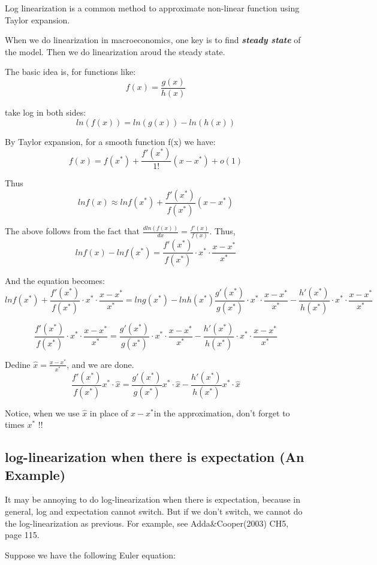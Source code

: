 \documentclass{book}
\theoremstyle{plain}
\theoremstyle{definition}
\begin{document}
Log linearization is a common method to approximate non-linear function using Taylor expansion.

When we do linearization in macroeconomics, one key is to find \emph{\textbf{steady state}} of the model.
Then we do linearization aroud the steady state.

The basic idea is, for functions like:
\[f(x)=\frac{g(x)}{h(x)}\]

take log in both sides:
\[ln(f(x))=ln(g(x))-ln(h(x))\]

By Taylor expansion, for a smooth function f(x) we have:
\[f(x)=f(x^*)+\frac{f'(x^*)}{1!}(x-x^*)+o(1)\]

Thus 
\[lnf(x) \approx lnf(x^*)+\frac{f'(x^*)}{f(x^*)}(x-x^*)\]

The above follows from the fact that $\frac{dln(f(x))}{dx}=\frac{f'(x)}{f(x)}$. Thus,
\[lnf(x)-lnf(x^*)=\frac{f'(x^*)}{f(x^*)} \cdot x^* \cdot \frac{x-x^*}{x^*}\]

And the equation becomes:
\[lnf(x^*)+\frac{f'(x^*)}{f(x^*)} \cdot x^* \cdot \frac{x-x^*}{x^*}=lng(x^*)-lnh(x^*)
\frac{g'(x^*)}{g(x^*)} \cdot x^* \cdot \frac{x-x^*}{x^*}-
\frac{h'(x^*)}{h(x^*)} \cdot x^* \cdot \frac{x-x^*}{x^*}\]

\[\frac{f'(x^*)}{f(x^*)} \cdot x^* \cdot \frac{x-x^*}{x^*}=
\frac{g'(x^*)}{g(x^*)} \cdot x^* \cdot \frac{x-x^*}{x^*}-
\frac{h'(x^*)}{h(x^*)} \cdot x^* \cdot \frac{x-x^*}{x^*}\]

Dedine $\hat x=\frac{x-x^*}{x^*}$, and we are done.
\[\frac{f'(x^*)}{f(x^*)} x^* \cdot \hat x=
\frac{g'(x^*)}{g(x^*)} x^* \cdot \hat x-
\frac{h'(x^*)}{h(x^*)} x^* \cdot \hat x\]

Notice, when we use $\hat x$ in place of $x-x^*$in the approximation,
don't forget to times $x^*$ !!\\


\subsection{log-linearization when there is expectation (An Example)}

It may be annoying to do log-linearization when there is expectation,
because in general,
log and expectation cannot switch.
But if we don't switch, we cannot do the log-linearization as previous.
For example, see Adda\&Cooper(2003) CH5, page 115.

Suppose we have the following Euler equation:
\end{document}
